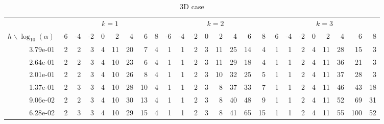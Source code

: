 \documentclass{amsart}
\begin{document}
	
	\begin{table}[h]
		\caption{3D case}
		\footnotesize
		\begin{tabular}{r|rrrrrrrr|rrrrrrrr|rrrrrrrr}
			\hline
			& \multicolumn{8}{|c}{$k = 1$} & \multicolumn{8}{|c}{$k = 2$} & \multicolumn{8}{|c}{$k = 3$}\\
			$h \backslash \log_{10}(\alpha)$ & -6 & -4 & -2 & 0 & 2 & 4 & 6 & 8 & -6 & -4 & -2 & 0 & 2 & 4 & 6 & 8 & -6 & -4 & -2 & 0 & 2 & 4 & 6 & 8 \\
			\hline
			3.79e-01 & 2 & 2 & 3 & 4 & 11 & 20 & 7 & 4 & 1 & 1 & 2 & 3 & 11 & 25 & 14 & 4 & 1 & 1 & 2 & 4 & 11 & 28 & 15 & 3 \\
			2.64e-01 & 2 & 2 & 3 & 4 & 10 & 23 & 6 & 4 & 1 & 1 & 2 & 3 & 11 & 29 & 18 & 4 & 1 & 1 & 2 & 4 & 11 & 36 & 21 & 3 \\
			2.01e-01 & 2 & 2 & 3 & 4 & 10 & 26 & 8 & 4 & 1 & 1 & 2 & 3 & 10 & 32 & 25 & 5 & 1 & 1 & 2 & 4 & 11 & 37 & 28 & 3 \\
			1.37e-01 & 2 & 3 & 3 & 4 & 10 & 28 & 10 & 4 & 1 & 1 & 2 & 3 & 8 & 37 & 33 & 7 & 1 & 1 & 2 & 4 & 11 & 46 & 43 & 18 \\
			9.06e-02 & 2 & 2 & 3 & 4 & 10 & 30 & 13 & 4 & 1 & 1 & 2 & 3 & 8 & 40 & 48 & 9 & 1 & 1 & 2 & 4 & 11 & 52 & 69 & 31 \\
			6.28e-02 & 2 & 3 & 3 & 4 & 10 & 29 & 15 & 4 & 1 & 1 & 2 & 3 & 8 & 41 & 65 & 15 & 1 & 1 & 2 & 4 & 11 & 55 & 100 & 52 
		\end{tabular}
	\end{table}
	
	
	
	
\end{document}
